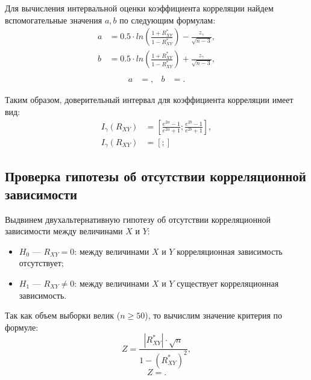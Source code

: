\documentclass[14pt,hidelinks]{extarticle}
\begin{document}
Для вычисления интервальной оценки коэффициента корреляции найдем вспомогательные значения $a, b$ по следующим формулам:
\begin{equation}
  \begin{aligned}
    a &= 0.5 \cdot ln \left( \frac{1+R^*_{XY}}{1-R^*_{XY}} \right) - \frac{z_{\gamma}}{\sqrt{n-3}}, \\
    b &= 0.5 \cdot ln \left( \frac{1+R^*_{XY}}{1-R^*_{XY}} \right) + \frac{z_{\gamma}}{\sqrt{n-3}}, \\
  \end{aligned}
\end{equation}
\begin{equation*}
  \begin{aligned}
    a &= , &
    b &= .
  \end{aligned}
\end{equation*}

Таким образом, доверительный интервал для коэффициента корреляции имеет вид:
\begin{align}
  I_{\gamma} (R_{XY}) &= \left[ \frac{e^{2a}-1}{e^{2a}+1}; \frac{e^{2b}-1}{e^{2b}+1} \right], \\ \nonumber
  I_{\gamma} (R_{XY}) &= \left[ ; 
     \right]
\end{align}

\newpage 

\subsection{Проверка гипотезы об отсутствии корреляционной зависимости}
Выдвинем двухальтернативную гипотезу об отсутствии корреляционной зависимости 
между величинами $ X $ и $ Y $:

\begin{itemize}
\item $H_0$ --- $ R_{XY} = 0 $: между величинами $ X $ и $ Y $ корреляционная зависимость отсутствует;
\item $H_1$ --- $ R_{XY} \neq 0 $: между величинами $ X $ и $ Y $ существует корреляционная зависимость.
\end{itemize}

Так как объем выборки велик ($ n \ge 50 $), то вычислим значение критерия по формуле:
\begin{equation}
  Z = \dfrac{|R^*_{XY}| \cdot \sqrt{n}}{1-(R^*_{XY})^2},
\end{equation}
\begin{equation*}
  Z = .
\end{equation*}
\end{document}
